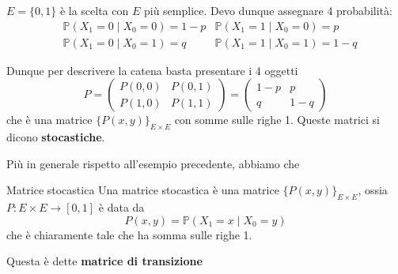 \begin{example}{}
    \(E = \{0, 1\} \) è la scelta con \(E\) più semplice. Devo dunque assegnare
    4 probabilità:
    \begin{align*}
    &\mathbb{P}{(X_{1} = 0 \;|\; X_{0} = 0)} = 1-p
    &\mathbb{P}{(X_{1} = 1 \;|\; X_{0} = 0)} = p\\
    &\mathbb{P}{(X_{1} = 0 \;|\; X_{0} = 1)} = q
    &\mathbb{P}{(X_{1} = 1 \;|\; X_{0} = 1)} = 1-q
    \end{align*}

\begin{center}
\end{center}

    Dunque per descrivere la catena basta presentare i 4 oggetti
    \[
      P = \begin{pmatrix}
          P{(0,0)} & P{(0,1)} \\
          P{(1,0)} & P{(1,1)}
      \end{pmatrix} = \begin{pmatrix}
          1-p & p \\
          q & 1-q
      \end{pmatrix}
    \]
    che è una matrice \(\{P{(x,y)}\}_{E \times  E}  \) con somme sulle righe 1.
    Queste matrici si dicono \textbf{stocastiche}.
\end{example}

Più in generale rispetto all'esempio precedente, abbiamo che
\begin{definition}{Matrice stocastica}
   Una matrice stocastica è una matrice \(\{P{(x, y)}\} _{E \times  E} \), ossia
   \(P : E \times E \to [0, 1]\) è data da 
   \[
     P{(x, y)} = \mathbb{P}{(X_{1} = x \;|\; X_{0} = y)}
   \]
   che è chiaramente tale che ha somma sulle righe 1.
   
   Questa è dette \textbf{matrice di transizione}
\end{definition}

